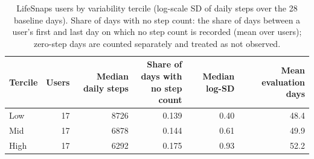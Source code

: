 \begin{table}[t]
\centering
\small
\caption{LifeSnaps users by variability tercile (log-scale SD of daily steps over the 28 baseline days). Share of days with no step count: the share of days between a user's first and last day on which no step count is recorded (mean over users); zero-step days are counted separately and treated as not observed.}
\label{tab:lsterc}
\begin{tabular}{@{}lrrrrr@{}}
\toprule
Tercile & Users & Median daily steps & \shortstack[r]{Share of days with\\no step count} & Median log-SD & Mean evaluation days \\
\midrule
Low & 17 & 8726 & 0.139 & 0.40 & 48.4 \\
Mid & 17 & 6878 & 0.144 & 0.61 & 49.9 \\
High & 17 & 6292 & 0.175 & 0.93 & 52.2 \\
\bottomrule
\end{tabular}
\end{table}
